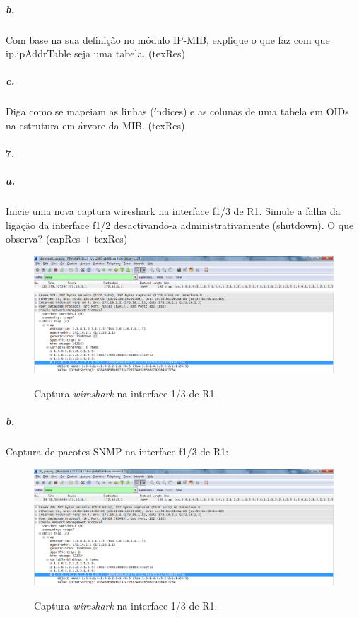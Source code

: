 \subparagraph{b.}
Com base na sua definição no módulo IP-MIB, explique o que faz com que ip.ipAddrTable seja uma tabela. (texRes)


\subparagraph{c.}
Diga como se mapeiam as linhas (índices) e as colunas de uma tabela em OIDs na estrutura em árvore da MIB. (texRes)


\paragraph{7.}

\subparagraph{a.}
Inicie uma nova captura wireshark na interface f1/3 de R1. Simule a falha da ligação da interface f1/2 desactivando-a administrativamente (shutdown). O que observa? (capRes + texRes)

\begin{figure}[h]
\centering
\includegraphics[width=1\textwidth, height=0.33\textheight]{7a.png}
\label{fig:2-capturaWireshark}
\caption{Captura \emph{wireshark} na interface \textsf{1/3} de \textsf{R1}.}
\end{figure}


\subparagraph{b.}
Captura de pacotes SNMP na interface \textsf{f1/3} de \textsf{R1}:

\begin{figure}[h]
\centering
\includegraphics[width=1\textwidth, height=0.33\textheight]{7b.png}
\label{fig:2-capturaWireshark}
\caption{Captura \emph{wireshark} na interface \textsf{1/3} de \textsf{R1}.}
\end{figure}


